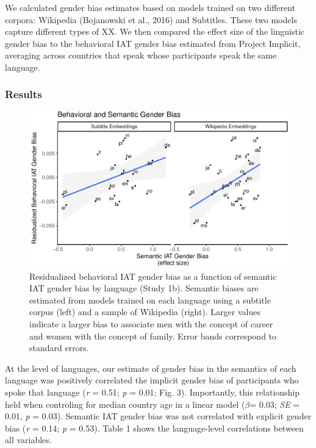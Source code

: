 \documentclass[man,floatsintext]{apa6}
\theoremstyle{definition}
\theoremstyle{definition}
\theoremstyle{definition}
\theoremstyle{remark}
\begin{document}
We calculated gender bias estimates based on models trained on two
different corpora: Wikipedia (Bojanowski et al., 2016) and Subtitles.
These two models capture different types of XX. We then compared the
effect size of the linguistic gender bias to the behavioral IAT gender
bias estimated from Project Implicit, averaging across countries that
speak whose participants speak the same language.

\subsubsection{Results}\label{results}

\begin{figure}
\centering
\includegraphics{iat_lang_files/figure-latex/unnamed-chunk-12-1.pdf}
\caption{\label{fig:unnamed-chunk-12}Residualized behavioral IAT gender bias
as a function of semantic IAT gender bias by language (Study 1b).
Semantic biases are estimated from models trained on each language using
a subtitle corpus (left) and a sample of Wikipedia (right). Larger
values indicate a larger bias to associate men with the concept of
career and women with the concept of family. Error bands correspond to
standard errors.}
\end{figure}

At the level of languages, our estimate of gender bias in the semantics
of each language was positively correlated the implicit gender bias of
participants who spoke that language (\emph{r} = 0.51; \emph{p} = 0.01;
Fig. 3). Importantly, this relationship held when controling for median
country age in a linear model (\(\beta\)= 0.03; \emph{SE} = 0.01,
\emph{p} = 0.03). Semantic IAT gender bias was not correlated with
explicit gender bias (\emph{r} = 0.14; \emph{p} = 0.53). Table 1 shows
the language-level correlations between all variables.
\end{document}
